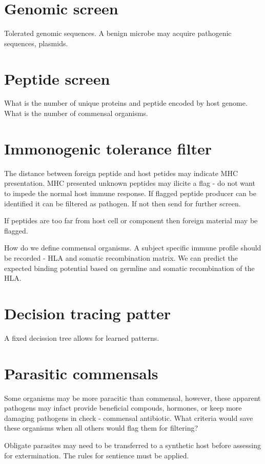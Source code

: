 \documentclass[preprint,11pt,fleqn]{elsarticle}
\begin{document}
\section{Genomic screen}
Tolerated genomic sequences.
A benign microbe may acquire pathogenic sequences, plasmids.

\section{Peptide screen}

What is the number of unique proteins and peptide encoded by host genome.
What is the number of commensal organisms.


\section{Immonogenic tolerance filter}
The distance between foreign peptide and host petides may indicate MHC presentation.
MHC presented unknown peptides may ilicite a flag - do not want to impede the normal host immune response. 
If flagged peptide producer can be identified it can be filtered as pathogen.
If not then send for further screen.

If peptides are too far from host cell or component then foreign material may be flagged.

How do we define commensal organisms. 
A subject specific immune profile should be recorded - HLA and somatic recombination matrix. 
We can predict the expected binding potential based on germline and somatic recombination of the HLA. 

\section{Decision tracing patter}
A fixed decission tree allows for learned patterns.


\section{Parasitic commensals}
Some organisms may be more paracitic than commensal, however, these apparent
pathogens may infact provide beneficial compouds, hormones, or keep more damaging pathogens in check - commensal antibiotic. 
What criteria would save these organisms when all others would flag them for filtering?

Obligate parasites may need to be transferred to a synthetic host before assessing for extermination. 
The rules for sentience must be applied. 
\end{document}
